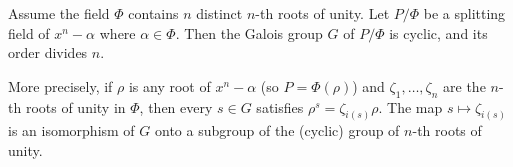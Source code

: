 Assume the field $\Phi$ contains $n$ distinct $n$-th roots of unity. Let $P/\Phi$ be a splitting field of $x^n - \alpha$ where $\alpha \in \Phi$. Then the Galois group $G$ of $P/\Phi$ is cyclic, and its order divides $n$.

More precisely, if $\rho$ is any root of $x^n - \alpha$ (so $P = \Phi(\rho)$) and $\zeta_1, \dots, \zeta_n$ are the $n$-th roots of unity in $\Phi$, then every $s \in G$ satisfies $\rho^s = \zeta_{i(s)}\rho$. The map $s \mapsto \zeta_{i(s)}$ is an isomorphism of $G$ onto a subgroup of the (cyclic) group of $n$-th roots of unity.
